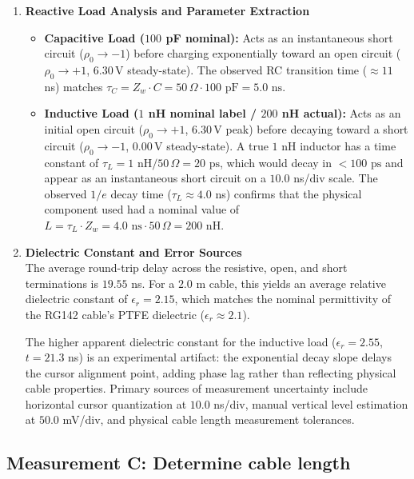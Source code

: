 \begin{enumerate}
    \item \textbf{Reactive Load Analysis and Parameter Extraction}
    \begin{itemize}
        \item \textbf{Capacitive Load ($100$ pF nominal):} Acts as an instantaneous short circuit ($\rho_0 \to -1$) before charging exponentially toward an open circuit ($\rho_0 \to +1$, $6.30$\,V steady-state). The observed RC transition time ($\approx 11$ ns) matches $\tau_C = Z_w \cdot C = 50\,\Omega \cdot 100\text{ pF} = 5.0\text{ ns}$.
        \item \textbf{Inductive Load ($1$ nH nominal label / $200$ nH actual):} Acts as an initial open circuit ($\rho_0 \to +1$, $6.30$\,V peak) before decaying toward a short circuit ($\rho_0 \to -1$, $0.00$\,V steady-state). A true $1$ nH inductor has a time constant of $\tau_L = 1\text{ nH} / 50\,\Omega = 20\text{ ps}$, which would decay in $< 100\text{ ps}$ and appear as an instantaneous short circuit on a $10.0$ ns/div scale. The observed $1/e$ decay time ($\tau_L \approx 4.0$ ns) confirms that the physical component used had a nominal value of $L = \tau_L \cdot Z_w = 4.0\text{ ns} \cdot 50\,\Omega = 200\text{ nH}$.
    \end{itemize}

    \item \textbf{Dielectric Constant and Error Sources} \\
    The average round-trip delay across the resistive, open, and short terminations is $19.55$ ns. For a $2.0$ m cable, this yields an average relative dielectric constant of $\epsilon_r = 2.15$, which matches the nominal permittivity of the RG142 cable's PTFE dielectric ($\epsilon_r \approx 2.1$). 
    
    \vspace{0.5em}
    The higher apparent dielectric constant for the inductive load ($\epsilon_r = 2.55$, $t = 21.3$ ns) is an experimental artifact: the exponential decay slope delays the cursor alignment point, adding phase lag rather than reflecting physical cable properties. Primary sources of measurement uncertainty include horizontal cursor quantization at $10.0$ ns/div, manual vertical level estimation at $50.0$ mV/div, and physical cable length measurement tolerances.
\end{enumerate}

\subsection{Measurement C: Determine cable length}

